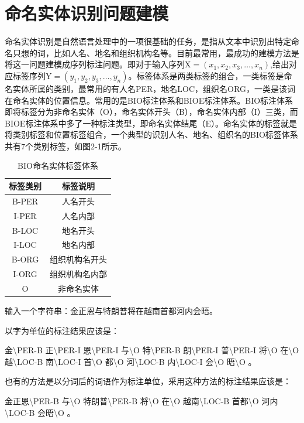 \documentclass[winfonts,master,oneside,nobackinfo]{njuthesis}
\begin{document}
\section{命名实体识别问题建模}
命名实体识别是自然语言处理中的一项很基础的任务，是指从文本中识别出特定命名只想的词，比如人名、地名和组织机构名等。目前最常用，最成功的建模方法是将这一问题建模成序列标注问题。即对于输入序列$\mathrm { X } = \left( x _ { 1 } , x _ { 2 } , x _ { 3 } , \dots , x _ { n } \right)$,给出对应标签序列$\mathrm { Y } = \left( y _ { 1 } , y _ { 2 } , y _ { 3 } , \dots , y _ { n } \right)$。标签体系是两类标签的组合，一类标签是命名实体所属的类别，最常用的有人名PER，地名LOC，组织名ORG，一类是该词在命名实体的位置信息。常用的是BIO标注体系和BIOE标注体系。BIO标注体系即将标签分为非命名实体（O），命名实体开头（B），命名实体内部（I）三类，而BIOE标注体系中多了一种标注类型，即命名实体结尾（E）。命名实体的标签就是将类别标签和位置标签组合，一个典型的识别人名、地名、组织名的BIO标签体系共有7个类别标签，如图2-1所示。

\begin{table}[!htbp]
\centering
\begin{tabular}{cc} %
\hline 
标签类别&标签说明\\
\hline  
B-PER&人名开头\\
I-PER&人名内部\\
B-LOC&地名开头\\
I-LOC&地名内部\\
B-ORG&组织机构名开头\\
I-ORG&组织机构名内部\\
O&非命名实体\\
\hline 
\end{tabular}
\caption{BIO命名实体标签体系}
\end{table}

输入一个字符串：金正恩与特朗普将在越南首都河内会晤。

以字为单位的标注结果应该是：

金\textbackslash PER-B 正\textbackslash PER-I 恩\textbackslash PER-I 与\textbackslash O 特\textbackslash PER-B 朗\textbackslash PER-I 普\textbackslash PER-I 将\textbackslash O 在\textbackslash O 越\textbackslash LOC-B 南\textbackslash LOC-I 首\textbackslash O 都\textbackslash O 河\textbackslash LOC-B 内\textbackslash LOC-I 会\textbackslash O 晤\textbackslash O 。

也有的方法是以分词后的词语作为标注单位，采用这种方法的标注结果应该是：

金正恩\textbackslash PER-B 与\textbackslash O 特朗普\textbackslash PER-B 将\textbackslash O 在\textbackslash O 越南\textbackslash LOC-B 首都\textbackslash O 河内\textbackslash LOC-B 会晤\textbackslash O 。
\end{document}
